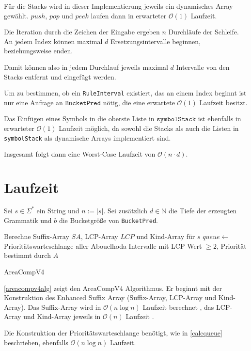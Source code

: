 Für die Stacks wird in dieser Implementierung jeweils ein dynamisches Array gewählt. $push$, $pop$ und $peek$ laufen dann in erwarteter $\mathcal{O}(1)$ Laufzeit.

Die Iteration durch die Zeichen der Eingabe ergeben $n$ Durchläufe der Schleife.
An jedem Index können maximal $d$ Ersetzungsintervalle beginnen, beziehungsweise enden.

Damit können also in jedem Durchlauf jeweils maximal $d$ Intervalle von den Stacks entfernt und eingefügt werden.

Um zu bestimmen, ob ein \texttt{RuleInterval} existiert, das an einem Index beginnt ist nur eine Anfrage an $\texttt{BucketPred}$ nötig, die eine erwartete $\mathcal{O}(1)$ Laufzeit besitzt.

Das Einfügen eines Symbols in die oberste Liste in $\texttt{symbolStack}$ ist ebenfalls in erwarteter $\mathcal{O}(1)$ Laufzeit möglich, da sowohl die Stacks als auch die Listen in \texttt{symbolStack} als dynamische Arrays implementiert sind.

Insgesamt folgt dann eine Worst-Case Laufzeit von $\mathcal{O}(n \cdot d)$.

\section{Laufzeit}

Sei $s \in \Sigma^*$ ein String und $n := |s|$. Sei zusätzlich $d \in \mathbb{N}$ die Tiefe der erzeugten Grammatik und $b$ die Bucketgröße von \texttt{BucketPred}.

\begin{algorithm}[t]
    Berechne Suffix-Array $SA$, LCP-Array $LCP$ und Kind-Array für $s$\;
    $queue \leftarrow$ Prioritätswarteschlange aller Abouelhoda-Intervalle mit LCP-Wert $\geq 2$, Priorität bestimmt durch $A$\;
    \caption{AreaCompV4}
    \label{areacompv4alg}
\end{algorithm}


\autoref{areacompv4alg} zeigt den AreaCompV4 Algorithmus.
Er beginnt mit der Konstruktion des Enhanced Suffix Array (Suffix-Array, LCP-Array und Kind-Array). Das Suffix-Array wird in $\mathcal{O}(n \log n)$ Laufzeit berechnet \cite{larsson_faster_2007}, das LCP-Array und Kind-Array jeweils in $\mathcal{O}(n)$ Laufzeit \cite{kasai_linear-time_2001, abouelhoda_optimal_2002}.

Die Konstruktion der Prioritätswarteschlange benötigt, wie in \autoref{calcqueue} beschrieben, ebenfalls $\mathcal{O}(n \log n)$ Laufzeit.

